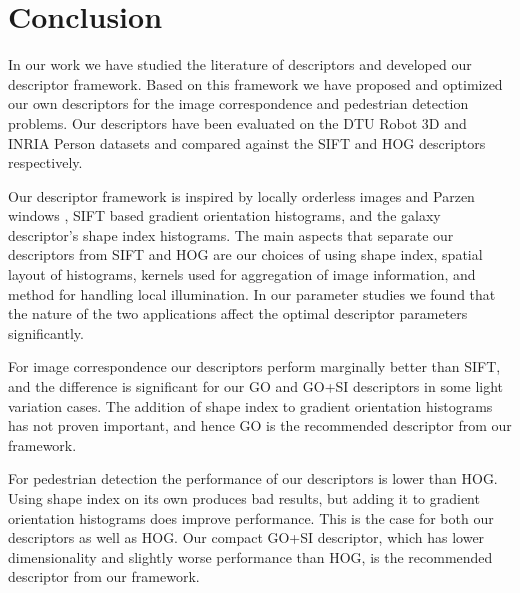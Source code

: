 \documentclass[thesis.tex]{subfiles}
\begin{document}
\chapter{Conclusion}

In our work we have studied the literature of descriptors and developed our descriptor framework. Based on this framework we have proposed and optimized our own descriptors for the image correspondence and pedestrian detection problems. Our descriptors have been evaluated on the DTU Robot 3D and INRIA Person datasets and compared against the SIFT \cite{lowe2004distinctive} and HOG \cite{felzenszwalb2009object} descriptors respectively.

Our descriptor framework is inspired by locally orderless images \cite{koenderink1999structure} and Parzen windows \cite{parzen1962estimation}, SIFT based gradient orientation histograms, and the galaxy descriptor's \cite{pedersen2013shape} shape index histograms. The main aspects that separate our descriptors from SIFT and HOG are our choices of using shape index, spatial layout of histograms, kernels used for aggregation of image information, and method for handling local illumination. In our parameter studies we found that the nature of the two applications affect the optimal descriptor parameters significantly.

For image correspondence our descriptors perform marginally better than SIFT, and the difference is significant for our GO and GO+SI descriptors in some light variation cases. The addition of shape index to gradient orientation histograms has not proven important, and hence GO is the recommended descriptor from our framework.

For pedestrian detection the performance of our descriptors is lower than HOG. Using shape index on its own produces bad results, but adding it to gradient orientation histograms does improve performance. This is the case for both our descriptors as well as HOG. Our compact GO+SI descriptor, which has lower dimensionality and slightly worse performance than HOG, is the recommended descriptor from our framework.

\subbibliography
\end{document}
